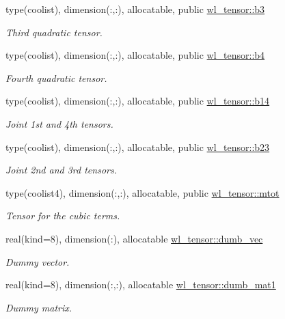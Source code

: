 \begin{DoxyCompactItemize}
type(coolist), dimension(\+:,\+:), allocatable, public \hyperlink{namespacewl__tensor_acb8c2d5390bd52d0639dc7ae48a0f7de}{wl\+\_\+tensor\+::b3}
\begin{DoxyCompactList}\small\item\em Third quadratic tensor. \end{DoxyCompactList}\item 
type(coolist), dimension(\+:,\+:), allocatable, public \hyperlink{namespacewl__tensor_a38deaa44b73e766ce5cc8194e18a1540}{wl\+\_\+tensor\+::b4}
\begin{DoxyCompactList}\small\item\em Fourth quadratic tensor. \end{DoxyCompactList}\item 
type(coolist), dimension(\+:,\+:), allocatable, public \hyperlink{namespacewl__tensor_a61a16cdd059c4be04ecad332fe4b19f8}{wl\+\_\+tensor\+::b14}
\begin{DoxyCompactList}\small\item\em Joint 1st and 4th tensors. \end{DoxyCompactList}\item 
type(coolist), dimension(\+:,\+:), allocatable, public \hyperlink{namespacewl__tensor_a5bc7875af2f8e170302f6d8856010ce3}{wl\+\_\+tensor\+::b23}
\begin{DoxyCompactList}\small\item\em Joint 2nd and 3rd tensors. \end{DoxyCompactList}\item 
type(coolist4), dimension(\+:,\+:), allocatable, public \hyperlink{namespacewl__tensor_adca9555f9f2997566b295bcc1ef1df25}{wl\+\_\+tensor\+::mtot}
\begin{DoxyCompactList}\small\item\em Tensor for the cubic terms. \end{DoxyCompactList}\item 
real(kind=8), dimension(\+:), allocatable \hyperlink{namespacewl__tensor_abe9c42af0dab6da6584889043aaab679}{wl\+\_\+tensor\+::dumb\+\_\+vec}
\begin{DoxyCompactList}\small\item\em Dummy vector. \end{DoxyCompactList}\item 
real(kind=8), dimension(\+:,\+:), allocatable \hyperlink{namespacewl__tensor_a47f8f8062b343d2c40334f71b7bd7874}{wl\+\_\+tensor\+::dumb\+\_\+mat1}
\begin{DoxyCompactList}\small\item\em Dummy matrix. \end{DoxyCompactList}\item 

\end{DoxyCompactItemize}
